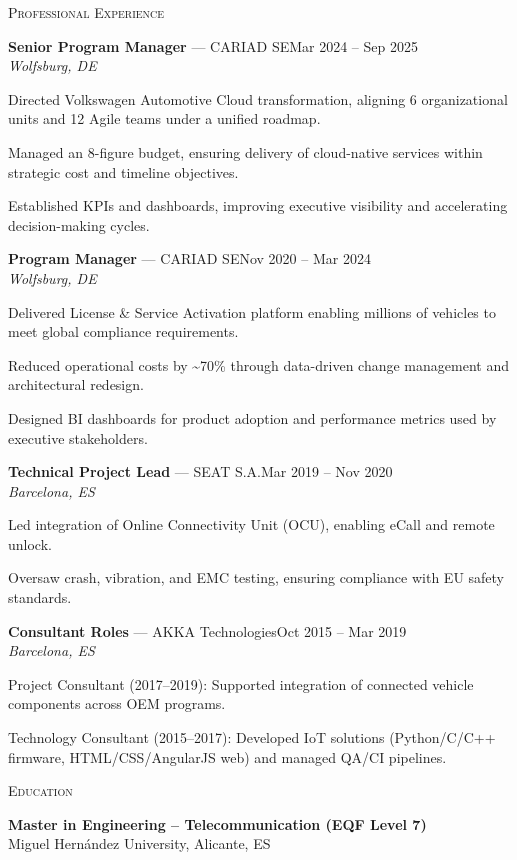 \documentclass[11pt,a4paper]{article}
\newcommand{\headright}[1]{\vspace{1.6ex}\textsc{\large\color{cvblue}#1}\par%
  \vspace*{-0.6ex}{\color{cvblue}\hrulefill}\par\vspace*{0.4ex}}
\newlength{\SideBarW}
\newenvironment{job}[4]{%
  \vspace{1.0ex}%
  \noindent\textbf{#2} {\color{darkgray}--- #1}\hfill {\small #3}\\%
  {\small\itshape #4}\par
\begin{list}{\textbullet}{%
      \setlength{\leftmargin}{1.4em}%
      \setlength{\labelsep}{0.5em}%
      \setlength{\itemsep}{0.2ex}%
      \setlength{\topsep}{0.2ex}%
      \setlength{\rightmargin}{6mm}%
      \setlength{\listparindent}{0pt}%
      \setlength{\parsep}{0pt}%
    }%
}{\end{list}}
\begin{document}
\begin{minipage}[t]{\textwidth}
\begin{minipage}[t]{\dimexpr\textwidth-\SideBarW-4mm\relax}
  \headright{Professional Experience}
  \vspace*{-0.5ex}

  \begin{job}{CARIAD SE}{Senior Program Manager}{Mar 2024 -- Sep 2025}{Wolfsburg, DE}
    \item Directed Volkswagen Automotive Cloud transformation, aligning 6 organizational units and 12 Agile teams under a unified roadmap.
    \item Managed an 8-figure budget, ensuring delivery of cloud-native services within strategic cost and timeline objectives.
    \item Established KPIs and dashboards, improving executive visibility and accelerating decision-making cycles.
  \end{job}

  \begin{job}{CARIAD SE}{Program Manager}{Nov 2020 -- Mar 2024}{Wolfsburg, DE}
    \item Delivered License \& Service Activation platform enabling millions of vehicles to meet global compliance requirements.
    \item Reduced operational costs by \textasciitilde70\% through data-driven change management and architectural redesign.
    \item Designed BI dashboards for product adoption and performance metrics used by executive stakeholders.
  \end{job}

  \begin{job}{SEAT S.A.}{Technical Project Lead}{Mar 2019 -- Nov 2020}{Barcelona, ES}
    \item Led integration of Online Connectivity Unit (OCU), enabling eCall and remote unlock.
    \item Oversaw crash, vibration, and EMC testing, ensuring compliance with EU safety standards.
  \end{job}

  \begin{job}{AKKA Technologies}{Consultant Roles}{Oct 2015 -- Mar 2019}{Barcelona, ES}
    \item Project Consultant (2017--2019): Supported integration of connected vehicle components across OEM programs.
    \item Technology Consultant (2015--2017): Developed IoT solutions (Python/C/C++ firmware, HTML/CSS/AngularJS web) and managed QA/CI pipelines.
  \end{job}

  \headright{Education}
  \vspace*{-0.5ex}
  \textbf{Master in Engineering – Telecommunication (EQF Level 7)} \\
  Miguel Hernández University, Alicante, ES

\end{minipage}

\end{minipage}
\end{document}
